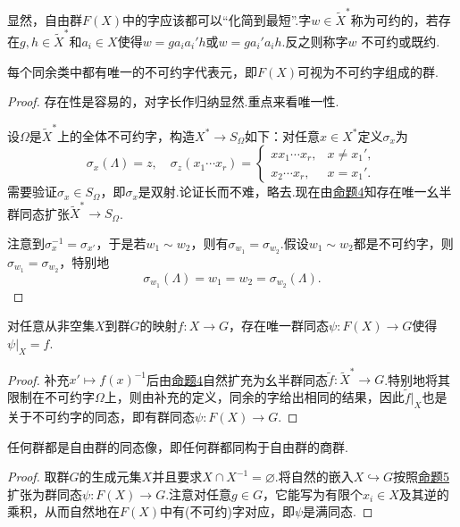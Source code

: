 显然，自由群$F(X)$中的字应该都可以“化简到最短”.字$w\in\widetilde{X}^*$称为{\heiti 可约的}，若存在$g,h\in\widetilde{X}^*$和$a_i\in X$使得$w=ga_ia_i'h$或$w=ga_i'a_ih$.反之则称字$w$ {\heiti 不可约}或{\heiti 既约}.
\begin{prop}
	每个同余类中都有唯一的不可约字代表元，即$F(X)$可视为不可约字组成的群.
\end{prop}
\begin{proof}
	存在性是容易的，对字长作归纳显然.重点来看唯一性.

	设$\Omega$是$\widetilde{X}^*$上的全体不可约字，构造$X^*\to S_\Omega$如下：对任意$x\in X^*$定义$\sigma_x$为
	\[
		\sigma_x(\Lambda)=z,\quad\sigma_z(x_1\cdots x_r)=\begin{cases}
			xx_1\cdots x_r, & x\ne x_1', \\
			x_2\cdots x_r,  & x=x_1'.
		\end{cases}
	\]
	需要验证$\sigma_x\in S_\Omega$，即$\sigma_x$是双射.论证长而不难，略去.现在由\hyperlink{prop:MonoidExtension}{命题4}知存在唯一幺半群同态扩张$\widetilde{X}^*\to S_\Omega$.

	注意到$\sigma_x^{-1}=\sigma_{x'}$，于是若$w_1\sim w_2$，则有$\sigma_{w_1}=\sigma_{w_2}$.假设$w_1\sim w_2$都是不可约字，则$\sigma_{w_1}=\sigma_{w_2}$，特别地
	\[
		\sigma_{w_1}(\Lambda)=w_1=w_2=\sigma_{w_2}(\Lambda).
	\]
\end{proof}
\begin{prop}
	对任意从非空集$X$到群$G$的映射$f\colon X\to G$，存在唯一群同态$\psi\colon F(X)\to G$使得$\psi|_X=f$.\hypertarget{prop:FreeGroupExtension}{}
\end{prop}
\begin{proof}
	补充$x'\mapsto f(x)^{-1}$后由\hyperlink{prop:MonoidExtension}{命题4}自然扩充为幺半群同态$\tilde{f}\colon\widetilde{X}^*\to G$.特别地将其限制在不可约字$\Omega$上，则由补充的定义，同余的字给出相同的结果，因此$\tilde{f}|_X$也是关于不可约字的同态，即有群同态$\psi\colon F(X)\to G$.
\end{proof}
\begin{thm}
	任何群都是自由群的同态像，即任何群都同构于自由群的商群.
\end{thm}
\begin{proof}
	取群$G$的生成元集$X$并且要求$X\cap X^{-1}=\varnothing$.将自然的嵌入$X\hookrightarrow G$按照\hyperlink{prop:FreeGroupExtension}{命题5}扩张为群同态$\psi\colon F(X)\to G$.注意对任意$g\in G$，它能写为有限个$x_i\in X$及其逆的乘积，从而自然地在$F(X)$中有(不可约)字对应，即$\psi$是满同态.
\end{proof}

